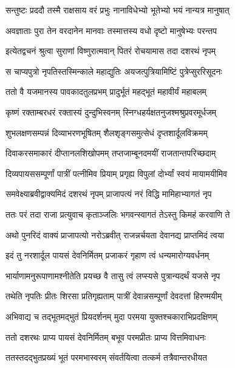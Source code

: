 \twolineshloka
{सन्तुष्टः प्रददौ तस्मै राक्षसाय वरं प्रभुः}
{नानाविधेभ्यो भूतेभ्यो भयं नान्यत्र मानुषात्} %

\twolineshloka
{अवज्ञाताः पुरा तेन वरदानेन मानवाः}
{तस्मात्तस्य वधो दृष्टो मानुषेभ्यः परन्तप} %

\twolineshloka
{इत्येतद्वचनं श्रुत्वा सुराणां विष्णुरात्मवान्}
{पितरं रोचयामास तदा दशरथं नृपम्} %

\twolineshloka
{स चाप्यपुत्रो नृपतिस्तस्मिन्काले महाद्युतिः}
{अयजत्पुत्रियामिष्टिं पुत्रेप्सुररिसूदनः} %

\twolineshloka
{ततो वै यजमानस्य पावकादतुलप्रभम्}
{प्रादुर्भूतं महद्भूतं महावीर्यं महाबलम्} %

\twolineshloka
{कृष्णं रक्ताम्बरधरं रक्तास्यं दुन्दुभिस्वनम्}
{स्निग्धहर्यक्षतनुजश्मश्रुप्रवरमूर्धजम्} %

\twolineshloka
{शुभलक्षणसम्पन्नं दिव्याभरणभूषितम्}
{शैलशृङ्गसमुत्सेधं दृप्तशार्दूलविक्रमम्} %

\twolineshloka
{दिवाकरसमाकारं दीप्तानलशिखोपमम्}
{तप्तजाम्बूनदमयीं राजतान्तपरिच्छदाम्} %

\twolineshloka
{दिव्यपायससम्पूर्णां पात्रीं पत्नीमिव प्रियाम्}
{प्रगृह्य विपुलां दोर्भ्यां स्वयं मायामयीमिव} %

\twolineshloka
{समवेक्ष्याब्रवीद्वाक्यमिदं दशरथं नृपम्}
{प्राजापत्यं नरं विद्धि मामिहाभ्यागतं नृप} %

\twolineshloka
{ततः परं तदा राजा प्रत्युवाच कृताञ्जलिः}
{भगवन्स्वागतं तेऽस्तु किमहं करवाणि ते} %

\twolineshloka
{अथो पुनरिदं वाक्यं प्राजापत्यो नरोऽब्रवीत्}
{राजन्नर्चयता देवानद्य प्राप्तमिदं त्वया} %

\twolineshloka
{इदं तु नरशार्दूल पायसं देवनिर्मितम्}
{प्रजाकरं गृहाण त्वं धन्यमारोग्यवर्धनम्} %

\twolineshloka
{भार्याणामनुरूपाणामश्नीतेति प्रयच्छ वै}
{तासु त्वं लप्स्यसे पुत्रान्यदर्थं यजसे नृप} %

\twolineshloka
{तथेति नृपतिः प्रीतः शिरसा प्रतिगृह्यताम्}
{पात्रीं देवान्नसम्पूर्णां देवदत्तां हिरण्मयीम्} %

\twolineshloka
{अभिवाद्य च तद्भूतमद्भुतं प्रियदर्शनम्}
{मुदा परमया युक्तश्चकाराभिप्रदक्षिणम्} %

\twolineshloka
{ततो दशरथः प्राप्य पायसं देवनिर्मितम्}
{बभूव परमप्रीतः प्राप्य वित्तमिवाधनः} %

\twolineshloka
{ततस्तदद्भुतप्रख्यं भूतं परमभास्वरम्}
{संवर्तयित्वा तत्कर्म तत्रैवान्तरधीयत} %

